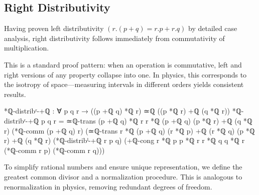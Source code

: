 \documentclass[11pt,a4paper]{book}
\def\cdot{.}%
\begin{document}
\subsection{Right Distributivity}

Having proven left distributivity $(r \cdot (p + q) = r \cdot p + r \cdot q)$ by detailed case analysis, right distributivity follows immediately from commutativity of multiplication.

This is a standard proof pattern: when an operation is commutative, left and right versions of any property collapse into one.
In physics, this corresponds to the isotropy of space---measuring intervals in different orders yields consistent results.

\begin{code}
*ℚ-distribʳ-+ℚ : ∀ p q r → ((p +ℚ q) *ℚ r) ≃ℚ ((p *ℚ r) +ℚ (q *ℚ r))
*ℚ-distribʳ-+ℚ p q r = 
  ≃ℚ-trans {(p +ℚ q) *ℚ r} {r *ℚ (p +ℚ q)} {(p *ℚ r) +ℚ (q *ℚ r)}
    (*ℚ-comm (p +ℚ q) r)
    (≃ℚ-trans {r *ℚ (p +ℚ q)} {(r *ℚ p) +ℚ (r *ℚ q)} {(p *ℚ r) +ℚ (q *ℚ r)}
      (*ℚ-distribˡ-+ℚ r p q)
      (+ℚ-cong {r *ℚ p} {p *ℚ r} {r *ℚ q} {q *ℚ r} 
               (*ℚ-comm r p) (*ℚ-comm r q)))
\end{code}

To simplify rational numbers and ensure unique representation, we define the greatest common divisor and a normalization procedure. This is analogous to renormalization in physics, removing redundant degrees of freedom.
\end{document}
